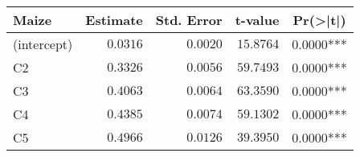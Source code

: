 \begin{table}[!tbp]
\begin{center}
\begin{tabular}{lrrrr}
\hline\hline
\multicolumn{1}{l}{Maize}&\multicolumn{1}{c}{Estimate}&\multicolumn{1}{c}{Std. Error}&\multicolumn{1}{c}{t-value}&\multicolumn{1}{c}{Pr(\textgreater |t|)}\tabularnewline
\hline
(intercept)&$0.0316$&$0.0020$&$15.8764$&$0.0000$***\tabularnewline
C2&$0.3326$&$0.0056$&$59.7493$&$0.0000$***\tabularnewline
C3&$0.4063$&$0.0064$&$63.3590$&$0.0000$***\tabularnewline
C4&$0.4385$&$0.0074$&$59.1302$&$0.0000$***\tabularnewline
C5&$0.4966$&$0.0126$&$39.3950$&$0.0000$***\tabularnewline
\hline
\end{tabular}\end{center}

\end{table}
